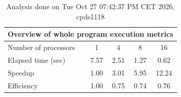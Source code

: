 \begin{table}[h]
\begin{center}
\begin{tabular}{|l|c|c|c|c|}
\hline
\multicolumn{5}{|c|}{Overview of whole program execution metrics} \\
\hline
\hline
Number of processors & 1 & 4 & 8 & 16 \\
\hline
Elapsed time (sec)      &       7.57 &       2.51 &       1.27 &       0.62 \\
\hline
Speedup                 &       1.00 &       3.01 &       5.95 &      12.24 \\
\hline
Efficiency              &       1.00 &       0.75 &       0.74 &       0.76 \\
\hline
\end{tabular}
\end{center}
\caption{ Analysis done on Tue Oct 27 07:42:37 PM CET 2026, cpds1118}
\end{table}
